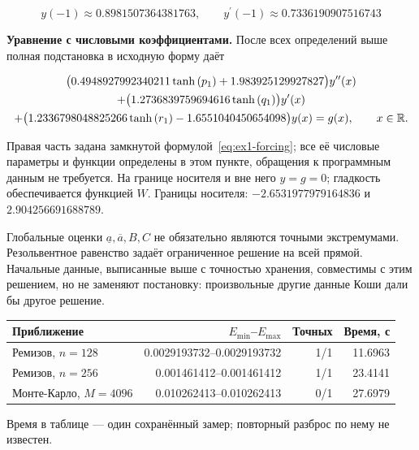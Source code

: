 \begin{equation}
y(-1)\approx0.8981507364381763,\qquad y^\prime(-1)\approx0.7336190907516743
\end{equation}


\noindent\textbf{Уравнение с числовыми коэффициентами.} После всех определений выше полная подстановка в исходную форму даёт

\begin{multline}\label{eq:ex1-ode}\bigl(0.4948927992340211 \tanh{\left(p_{1} \right)} + 1.983925129927827\bigr)y^{\prime\prime}(x)\\+\bigl(1.2736839759694616 \tanh{\left(q_{1} \right)}\bigr)y^\prime(x)\\+\bigl(1.2336798048825266 \tanh{\left(r_{1} \right)} - 1.6551040450654098\bigr)y(x)=g(x),\qquad x\in\mathbb R.\end{multline}

Правая часть задана замкнутой формулой~\eqref{eq:ex1-forcing}; все её числовые параметры и функции определены в этом пункте, обращения к программным данным не требуется. На границе носителя и вне него $y=g=0$; гладкость обеспечивается функцией $W$. Границы носителя: $-2.6531977979164836$ и $2.904256691688789$.

Глобальные оценки $\underline a,\overline a,B,C$ не обязательно являются точными экстремумами. Резольвентное равенство задаёт ограниченное решение на всей прямой. Начальные данные, выписанные выше с точностью хранения, совместимы с этим решением, но не заменяют постановку: произвольные другие данные Коши дали бы другое решение.

\begin{center}\label{tab:ex1}\begin{tabular}{lrrr}\toprule Приближение&$E_{\min}$--$E_{\max}$&Точных&Время, с\\\midrule

Ремизов, $n=128$&0.0029193732--0.0029193732&1/1&11.6963\\

Ремизов, $n=256$&0.001461412--0.001461412&1/1&23.4141\\

Монте-Карло, $M=4096$&0.010262413--0.010262413&0/1&27.6979\\

\bottomrule\end{tabular}\end{center}

Время в таблице --- один сохранённый замер; повторный разброс по нему не известен.

